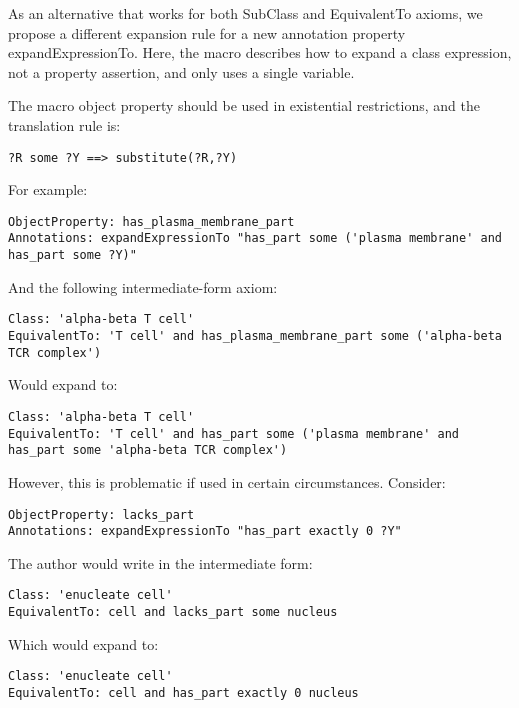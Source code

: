 \documentclass[11pt]{article}
\begin{document}
As an alternative that works for both SubClass and EquivalentTo
axioms, we propose a different expansion rule for a new annotation
property expandExpressionTo. Here, the macro describes how to expand a class
expression, not a property assertion, and only uses a single variable.

The macro object property should be used in existential restrictions,
and the translation rule is:

\begin{verbatim}
?R some ?Y ==> substitute(?R,?Y)
\end{verbatim}

For example:

\begin{verbatim}
ObjectProperty: has_plasma_membrane_part
Annotations: expandExpressionTo "has_part some ('plasma membrane' and has_part some ?Y)"
\end{verbatim}

And the following intermediate-form axiom:

\begin{verbatim}
Class: 'alpha-beta T cell'
EquivalentTo: 'T cell' and has_plasma_membrane_part some ('alpha-beta TCR complex')
\end{verbatim}

Would expand to:

\begin{verbatim}
Class: 'alpha-beta T cell'
EquivalentTo: 'T cell' and has_part some ('plasma membrane' and has_part some 'alpha-beta TCR complex')
\end{verbatim}


However, this is problematic if used in certain circumstances. Consider:

\begin{verbatim}
ObjectProperty: lacks_part
Annotations: expandExpressionTo "has_part exactly 0 ?Y"
\end{verbatim}

The author would write in the intermediate form:

\begin{verbatim}
Class: 'enucleate cell'
EquivalentTo: cell and lacks_part some nucleus
\end{verbatim}

Which would expand to:

\begin{verbatim}
Class: 'enucleate cell'
EquivalentTo: cell and has_part exactly 0 nucleus
\end{verbatim}
\end{document}

